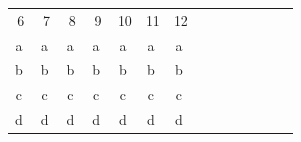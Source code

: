 \documentclass[fleqn]{article}
\begin{document}
\begin{center}
\begin{tabular}{cccccccccccccc}
6 & 7 & 8 & 9 & 10 & 11 & 12 \\ 
\textcircled{a} & \textcircled{a} & \textcircled{a} & \textcircled{a} & \textcircled{a} & \textcircled{a} & \textcircled{a}\\ 
\textcircled{b} & \textcircled{b} & \textcircled{b} & \textcircled{b} & \textcircled{b} & \textcircled{b} & \textcircled{b} \\ 
\textcircled{c} & \textcircled{c} & \textcircled{c} & \textcircled{c} & \textcircled{c} & \textcircled{c} & \textcircled{c}\\ 
\textcircled{d} & \textcircled{d} & \textcircled{d} & \textcircled{d} & \textcircled{d} & \textcircled{d} & \textcircled{d}\\ 
\end{tabular} 
\end{center}
\end{document}
